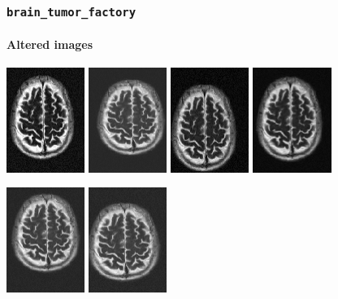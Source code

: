 \documentclass[]{beamer}
\newcommand{\btf}{\tt{brain\_tumor\_factory}}
\begin{document}
\begin{frame}
  \frametitle{\btf}
  \framesubtitle{Altered images}
  \begin{minipage}{\linewidth}
    \begin{center}
      \includegraphics[width=2.55cm]{resources/z1}
      \includegraphics[width=2.55cm]{resources/z2}
      \includegraphics[width=2.55cm]{resources/z3}
      \includegraphics[width=2.55cm]{resources/z4}
    \end{center}
  \end{minipage}
  \begin{minipage}{\linewidth}
    \begin{center}
      \includegraphics[width=2.55cm]{resources/z5}
      \includegraphics[width=2.55cm]{resources/z6}

\end{center}
\end{minipage}
\end{frame}
\end{document}

